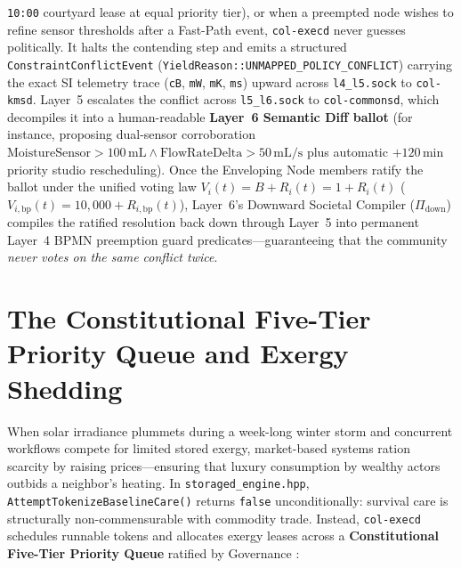 \begin{enumerate}
        \texttt{10:00} courtyard lease at equal priority tier), or when a preempted node
        wishes to refine sensor thresholds after a Fast-Path event, \texttt{col-execd} never
        guesses politically. It halts the contending step and emits a structured
        \texttt{ConstraintConflictEvent} (\texttt{YieldReason::UNMAPPED\_POLICY\_CONFLICT})
        carrying the exact SI telemetry trace (\texttt{cB}, \texttt{mW}, \texttt{mK},
        \texttt{ms}) upward across \texttt{l4\_l5.sock} to \texttt{col-kmsd}. Layer~5
        escalates the conflict across \texttt{l5\_l6.sock} to \texttt{col-commonsd}, which
        decompiles it into a human-readable \textbf{Layer~6 Semantic Diff ballot} (for
        instance, proposing dual-sensor corroboration $\text{MoistureSensor} > 100\,\mathrm{mL} \land \text{FlowRateDelta} > 50\,\mathrm{mL/s}$
        plus automatic $+120\,\mathrm{min}$ priority studio rescheduling). Once the
        Enveloping Node members ratify the ballot under the unified voting law
        $V_i(t) = B + R_i(t) = 1 + R_i(t)$ ($V_{i,\mathrm{bp}}(t) = 10{,}000 + R_{i,\mathrm{bp}}(t)$),
        Layer~6's Downward Societal Compiler ($\Pi_{\mathrm{down}}$) compiles the ratified
        resolution back down through Layer~5 into permanent Layer~4 BPMN preemption guard
        predicates---guaranteeing that the community \textit{never votes on the same conflict
        twice}.
\end{enumerate}

\section{The Constitutional Five-Tier Priority Queue and Exergy Shedding}
\label{sec:ch3-priority-queue}

When solar irradiance plummets during a week-long winter storm and concurrent workflows
compete for limited stored exergy, market-based systems ration scarcity by raising
prices---ensuring that luxury consumption by wealthy actors outbids a neighbor's heating. In
\texttt{storaged\_engine.hpp}, \texttt{AttemptTokenizeBaselineCare()} returns \texttt{false}
unconditionally: survival care is structurally non-commensurable with commodity trade.
Instead, \texttt{col-execd} schedules runnable tokens and allocates exergy leases across a
\textbf{Constitutional Five-Tier Priority Queue} ratified by Governance
\parencite{rockstrom2009safe,raworth2017}:

